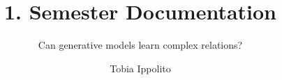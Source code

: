 
\usepackage[
	a4paper,
	top=2.5cm,
	bottom=2.5cm,
	left=3cm,
	right=3cm
]{geometry}

\usepackage[T1]{fontenc}
\usepackage{lmodern}

\usepackage[english]{babel}  %
\usepackage{blindtext}

\usepackage{microtype}

\frenchspacing

\usepackage[
	colorlinks=true,
	linkcolor=black,      %
	urlcolor=blue,        %
	citecolor=blue        %
]{hyperref}


\usepackage{setspace}
\onehalfspacing

\usepackage[style=ieee, 
		    backend=biber, 
		    isbn=true,
		    sortlocale=en_US]{biblatex}                  %

\setlength{\bibitemsep}{1em}     %
\setlength{\bibhang}{2em}        %

\usepackage{float}
\usepackage{graphicx}
\usepackage{placeins}


\title{1. Semester Documentation}
\subtitle{Can generative models learn complex relations?}
\author{Tobia Ippolito}
\date{}




